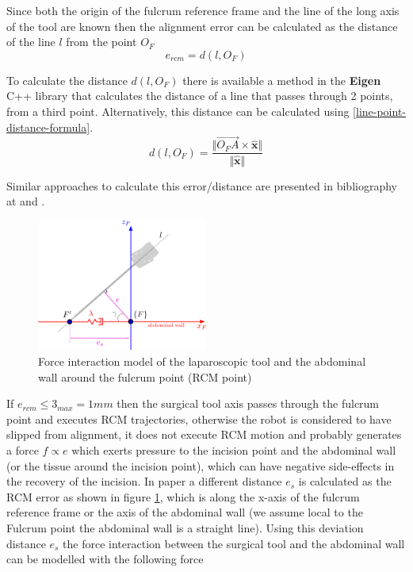 Since both the origin of the fulcrum reference frame and the line of the long axis of the tool are known then the alignment error can be calculated as the distance of the line $l$ from the point $O_F$
\begin{equation}
e_{rcm} = d(l, O_F)
\end{equation}

To calculate the distance $d(l, O_F)$ there is available a method in the \textbf{Eigen} C++ library that calculates the distance of a line that passes through 2 points, from a third point. Alternatively, this distance 
can be calculated using \ref{line-point-distance-formula}.
\begin{equation}
\label{line-point-distance-formula}
d(l, O_F) = \frac{\Vert \overrightarrow{O_FA} \times \mathbf{\hat{x}} \Vert}{\Vert \mathbf{\hat{x}} \Vert}
\end{equation}

Similar approaches to calculate this error/distance are presented in bibliography at \cite{Dong2016RobustTD} and \cite{Bauzano2009ControlMF}.\\

\begin{center}
\begin{figure}[!htb]
\centering
\includegraphics[width=0.5\textwidth]{images/rcm-force-interaction-model.png}
\caption{Force interaction model of the laparoscopic tool and the abdominal wall around the fulcrum point (RCM point)}
\label{rcm-force-interaction-model}
\end{figure}
\end{center}


If $e_{rcm} \leq 3_{max} = 1mm$ then the surgical tool axis passes through the fulcrum point and executes RCM trajectories, otherwise the robot is considered to have slipped from alignment, it does not execute RCM motion and 
probably generates a force $f \propto e$ which exerts pressure to the incision point and the abdominal wall (or the tissue around the incision point), which can have negative side-effects in the recovery of the incision.
In paper \cite{Bauzano2009ControlMF} a different distance $e_s$ is calculated as the RCM error as shown in figure \ref{rcm-force-interaction-model}, which is along the x-axis of the fulcrum reference frame or the axis 
of the abdominal wall (we assume local to the Fulcrum point the abdominal wall is a straight line). Using this deviation distance $e_s$ the force interaction between the surgical tool and the abdominal wall can be modelled 
with the following force

